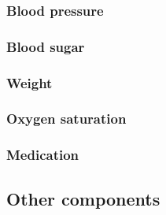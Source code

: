 
        \subsubsection{Blood pressure}


        \subsubsection{Blood sugar}


        \subsubsection{Weight}

        
        \subsubsection{Oxygen saturation}


        \subsubsection{Medication}


    \subsection{Other components}


